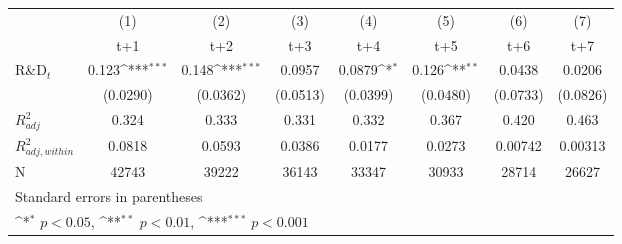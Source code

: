 {
\def\sym#1{\ifmmode^{#1}\else\(^{#1}\)\fi}
\begin{tabular}{l*{7}{c}}
\hline\hline
            &\multicolumn{1}{c}{(1)}&\multicolumn{1}{c}{(2)}&\multicolumn{1}{c}{(3)}&\multicolumn{1}{c}{(4)}&\multicolumn{1}{c}{(5)}&\multicolumn{1}{c}{(6)}&\multicolumn{1}{c}{(7)}\\
            &\multicolumn{1}{c}{t+1}&\multicolumn{1}{c}{t+2}&\multicolumn{1}{c}{t+3}&\multicolumn{1}{c}{t+4}&\multicolumn{1}{c}{t+5}&\multicolumn{1}{c}{t+6}&\multicolumn{1}{c}{t+7}\\
\hline
R\&D$_t$         &       0.123\sym{***}&       0.148\sym{***}&      0.0957         &      0.0879\sym{*}  &       0.126\sym{**} &      0.0438         &      0.0206         \\
            &    (0.0290)         &    (0.0362)         &    (0.0513)         &    (0.0399)         &    (0.0480)         &    (0.0733)         &    (0.0826)         \\
\hline
$R^2_{adj}$        &       0.324         &       0.333         &       0.331         &       0.332         &       0.367         &       0.420         &       0.463         \\
$R^2_{adj,within}$ &      0.0818         &      0.0593         &      0.0386         &      0.0177         &      0.0273         &     0.00742         &     0.00313         \\
N           &       42743         &       39222         &       36143         &       33347         &       30933         &       28714         &       26627         \\
\hline\hline
\multicolumn{8}{l}{\footnotesize Standard errors in parentheses}\\
\multicolumn{8}{l}{\footnotesize \sym{*} \(p<0.05\), \sym{**} \(p<0.01\), \sym{***} \(p<0.001\)}\\
\end{tabular}
}
